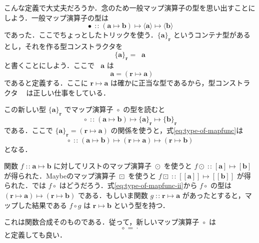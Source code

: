 \documentclass[a4paper]{jsbook}
\def\[{\left[\!\left[}
\def\]{\right]\!\right]}
\newcommand{\mListWith}[1]{\left[#1\right]}
\newcommand{\mMaybeWith}[1]{\[#1\]}
\newcommand{\mPureWith}[1]{\langle#1\rangle}
\newcommand{\mType}[1]{\mathbf{#1}}
\newcommand{\mListType}[1]{\mListWith{\mType{#1}}}
\newcommand{\mMaybeType}[1]{\mMaybeWith{\mType{#1}}}
\newcommand{\mPureType}[1]{\mPureWith{\mType{#1}}}
\newcommand{\mFuncType}[1]{\{\mType{#1}\}_\mType{r}}
\newcommand{\mTypeConstructor}[1]{\mathit{#1}} %
\DeclareMathOperator{\mIn}{{:\!:}}
\DeclareMathOperator{\mMapsTo}{\mapsto}
\DeclareMathOperator{\mComp}{\cdot}
\DeclareMathOperator{\mMap}{\bullet}
\DeclareMathOperator{\mMapList}{\odot}
\DeclareMathOperator{\mMapMaybe}{\boxdot}
\DeclareMathOperator{\mMapFunc}{\circ}
\DeclareMathOperator{\mFuncTypeConstructor}{\mTypeConstructor{Func}_\mType{r}}
\newcommand{\mProj}[2]{#1\mMapsTo#2}
\begin{document}
こんな定義で大丈夫だろうか．念のため一般マップ演算子の型を思い出すことにしよう．一般マップ演算子の型は
\begin{equation}
\mMap
\mIn{}
\mProj{
  (\mProj{\mType{a}}{\mType{b}})
}
{
  \mProj{\mPureType{a}}{\mPureType{b}}
}
\end{equation}
であった．ここでちょっとしたトリックを使う．$\mFuncType{a}$ というコンテナ型があるとし，それを作る型コンストラクタを
\begin{equation}
\mFuncType{a}=\mFuncTypeConstructor\mType{a}
\end{equation}
と書くことにしよう．ここで $\mFuncTypeConstructor\mType{a}$ は
\begin{equation}
\mFuncTypeConstructor\mType{a}=(\mProj{\mType{r}}{\mType{a}})
\end{equation}
であると定義する．ここに $\mProj{\mType{r}}{\mType{a}}$ は確かに正当な型であるから，型コンストラクタ $\mFuncTypeConstructor$ は正しい仕事をしている．

この新しい型 $\mFuncType{a}$ でマップ演算子 $\mMapFunc$ の型を読むと
\begin{equation}
\label{eq:type-of-mapfunc}
\mMapFunc
\mIn{}
\mProj{
  (\mProj{\mType{a}}{\mType{b}})
}
{
  \mProj{\mFuncType{a}}{\mFuncType{b}}
}
\end{equation}
である．ここで $\mFuncType{a}=(\mProj{\mType{r}}{\mType{a}})$ の関係を使うと，式\eqref{eq:type-of-mapfunc}は
\begin{equation}
\label{eq:type-of-mapfunc-ii}
\mMapFunc
\mIn{}
\mProj{
  (\mProj{\mType{a}}{\mType{b}})
}
{
  \mProj{(\mProj{\mType{r}}{\mType{a}})}{(\mProj{\mType{r}}{\mType{b}})}
}
\end{equation}
となる．

関数 $f\mIn\mProj{\mType{a}}{\mType{b}}$ に対してリストのマップ演算子 $\mMapList$ を使うと $f\mMapList\mIn\mProj{\mListType{a}}{\mListType{b}}$ が得られた．Maybeのマップ演算子 $\mMapMaybe$ を使うと $f\mMapMaybe\mIn\mProj{\mMaybeType{a}}{\mMaybeType{b}}$ が得られた．では $f\mMapFunc$ はどうだろう．式\eqref{eq:type-of-mapfunc-ii}から $f\mMapFunc$ の型は $\mProj{(\mProj{\mType{r}}{\mType{a}})}{(\mProj{\mType{r}}{\mType{b}})}$ である．もしいま関数 $g\mIn\mProj{\mType{r}}{\mType{a}}$ があったとすると，マップした結果である $f\mMapFunc g$ は $\mProj{\mType{r}}{\mType{b}}$ という型を持つ．

これは関数合成そのものである．従って，新しいマップ演算子 $\mMapFunc$ は
\begin{equation}
\mMapFunc=\mComp
\end{equation}
と定義しても良い．
\end{document}
